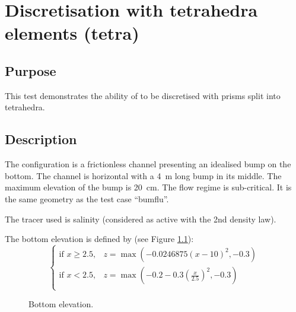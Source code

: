 \chapter{Discretisation with tetrahedra elements (tetra)}

\section{Purpose}

This test demonstrates the ability of  to be discretised
with prisms split into tetrahedra.

\section{Description}

The configuration is a frictionless channel presenting an idealised bump on the
bottom.
The channel is horizontal with a 4~m long bump in its middle.
The maximum elevation of the bump is 20~cm.
The flow regime is sub-critical.
It is the same geometry as the  test case ``bumflu''.

The tracer used is salinity (considered as active with the 2nd density law).

The bottom elevation is defined by (see Figure \ref{t3d:tetra:fig:Bottom}):
\begin{equation*}
\left\{
\begin{array}{rl}
  \textrm{if } x \ge 2.5, & z = \max \left(-0.0246875(x-10)^2, -0.3 \right)\\
  \textrm{if } x < 2.5, & z = \max \left(-0.2-0.3(\frac{x}{2.5})^2, -0.3 \right)\\
\end{array}
\right.
\end{equation*}



\begin{figure}[!htbp]
 \centering
 \caption{Bottom elevation.}
 \label{t3d:tetra:fig:Bottom}
\end{figure}

